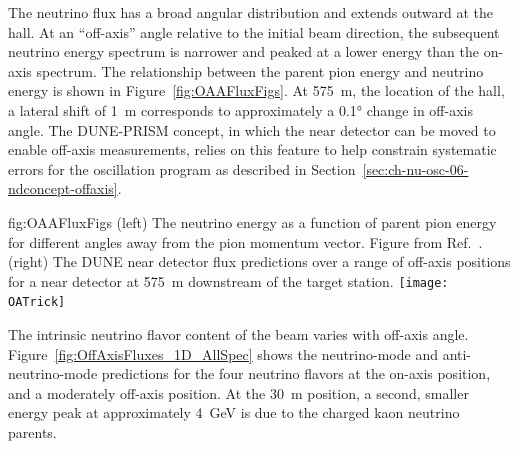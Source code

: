 The neutrino flux has a broad angular distribution and extends outward at the  hall. At an ``off-axis'' angle relative to the initial beam direction, the subsequent neutrino energy spectrum is narrower and peaked at a lower energy than the on-axis spectrum.
The relationship between the parent pion energy and neutrino energy is shown in Figure~\ref{fig:OAAFluxFigs}.  At \SI{575}{m}, the location of the  hall, a lateral shift of \SI{1}{m} corresponds to approximately a \ang{0.1} change in off-axis angle. 
The DUNE-PRISM concept, in which the near detector \lartpc can be moved to enable  off-axis measurements, relies on this feature to help constrain systematic errors for the  oscillation program as described in Section~\ref{sec:ch-nu-osc-06-ndconcept-offaxis}.

\begin{dunefigure} %
{fig:OAAFluxFigs}
{(left) The neutrino energy as a function of parent pion energy for different angles away from the pion momentum vector. Figure from Ref.~\cite{Duffy:2016owt}. (right) The DUNE near detector flux predictions over a range of off-axis positions for a near detector at \SI{575}{m} downstream of the target station. }
    \texttt{[image: OATrick]}
\end{dunefigure}

The intrinsic neutrino flavor content of the beam varies with off-axis angle. Figure~\ref{fig:OffAxisFluxes_1D_AllSpec} shows the neutrino-mode and anti-neutrino-mode predictions for the four neutrino flavors at the on-axis position, and a moderately off-axis position. At the \SI{30}{m} position, a second, smaller energy peak at approximately \SI{4}{\GeV} is due to the charged kaon neutrino parents. 

